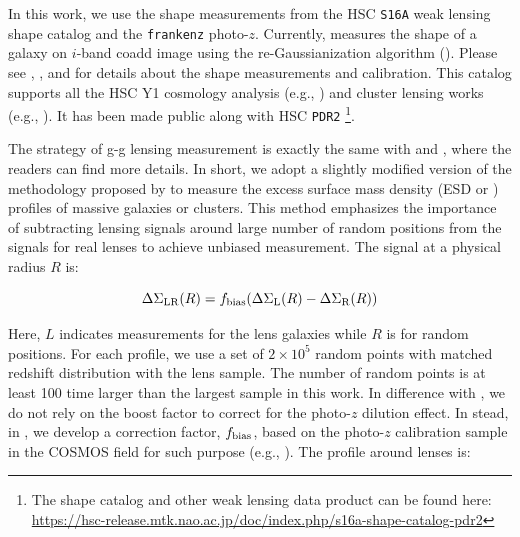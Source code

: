 \documentclass[fleqn,usenatbib,useAMS,english]{mnras}
\begin{document}
    In this work, we use the shape measurements from the HSC \texttt{S16A} weak lensing shape
    catalog and the \texttt{frankenz} photo-$z$.
    Currently, \hscpipe{} measures the shape of a galaxy on $i$-band coadd image using the
    re-Gaussianization algorithm (\citealt{HirataSeljak2003}).
    Please see \citet{HSC-PIPE}, \citet{HSC-WLCAT}, and \citet{HSC-WLCALIB} for details about
    the shape measurements and calibration.
    This catalog supports all the HSC Y1 cosmology analysis (e.g., \citealt{Hikage2019, Hamana2020})
    and cluster lensing works (e.g., \citealt{Umetsu2020}).
    It has been made public along with HSC \texttt{PDR2}
    \footnote{The shape catalog and other weak lensing data product can be found here:
    \href{here}{https://hsc-release.mtk.nao.ac.jp/doc/index.php/s16a-shape-catalog-pdr2}}.

    The strategy of g-g lensing measurement is exactly the same with \citet{Speagle2019} and
    \citet{Huang2020}, where the readers can find more details.
    In short, we adopt a slightly modified version of the methodology proposed by
    \citet{Singh2017} to measure the excess surface mass density (ESD or \dsigma{}) profiles of
    massive galaxies or clusters.
    This method emphasizes the importance of subtracting lensing signals around large number of
    random positions from the signals for real lenses to achieve unbiased measurement.
    The \dsigma{} signal at a physical radius $R$ is:

    \begin{equation}
        {\Delta\Sigma}_{\rm LR}(R) =
        f_{\rm bias}({\Delta\Sigma}_{\mathrm{L}}(R) - {\Delta\Sigma}_{\mathrm{R}}(R))
        \label{eq:ds1}
    \end{equation}

    Here, $L$ indicates measurements for the lens galaxies while $R$ is for random positions.
    For each \dsigma{} profile, we use a set of $2 \times 10^5$ random points with matched redshift
    distribution with the lens sample.
    The number of random points is at least 100 time larger than the largest sample in this work.
    In difference with \citet{Singh2017}, we do not rely on the boost factor to correct for
    the photo-$z$ dilution effect.
    In stead, in \citet{Speagle2019}, we develop a correction factor,  $f_{\rm bias}$, based
    on the photo-$z$ calibration sample in the COSMOS field for such purpose
    (e.g., \citealt{Mandelbaum2008, Nakajima2012, Leauthaud2017}).
    The \dsigma{} profile around lenses is:
\end{document}
